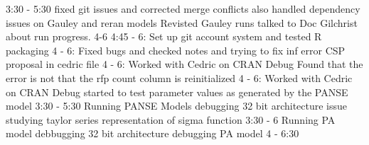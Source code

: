 \documentclass[12pt,hyperref]{labbook}
\begin{document}
3:30 - 5:30
fixed git issues and corrected merge conflicts also handled dependency issues on Gauley and reran models
Revisted Gauley runs talked to Doc Gilchrist about run progress.
4-6
4:45 - 6: Set up git account system and tested R packaging
4 - 6: Fixed bugs and checked notes and trying to fix inf error CSP proposal in cedric file
4 - 6: Worked with Cedric on CRAN Debug
 Found that the error is not that the rfp count column is reinitialized
4 - 6: Worked with Cedric on CRAN Debug
	started to test parameter values as generated by the PANSE model
3:30 - 5:30
	Running PANSE Models
	debugging 32 bit architecture issue
	studying taylor series representation of sigma function
3:30 - 6
	Running PA model
	debbugging 32 bit architecture
	debugging PA model
4 - 6:30
\end{document}
